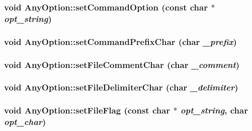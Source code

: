 \label{classAnyOption_a639b708b4c3953e7017f224b9b8082b3}
\hypertarget{classAnyOption_a7df8a4d9c0970f018c91b04bd4c11022}{
\subsubsection[{setCommandOption}]{\setlength{\rightskip}{0pt plus 5cm}void AnyOption::setCommandOption (const char $\ast$ {\em opt\_\-string})}}
\label{classAnyOption_a7df8a4d9c0970f018c91b04bd4c11022}
\hypertarget{classAnyOption_abc3444f2cbbb06f7d6c9a63e49f4992a}{
\subsubsection[{setCommandPrefixChar}]{\setlength{\rightskip}{0pt plus 5cm}void AnyOption::setCommandPrefixChar (char {\em \_\-prefix})}}
\label{classAnyOption_abc3444f2cbbb06f7d6c9a63e49f4992a}
\hypertarget{classAnyOption_a3b164315d146fbc1f8751b0542a8b495}{
\subsubsection[{setFileCommentChar}]{\setlength{\rightskip}{0pt plus 5cm}void AnyOption::setFileCommentChar (char {\em \_\-comment})}}
\label{classAnyOption_a3b164315d146fbc1f8751b0542a8b495}
\hypertarget{classAnyOption_a1076bb812db730236c5309cdb97c8161}{
\subsubsection[{setFileDelimiterChar}]{\setlength{\rightskip}{0pt plus 5cm}void AnyOption::setFileDelimiterChar (char {\em \_\-delimiter})}}
\label{classAnyOption_a1076bb812db730236c5309cdb97c8161}
\hypertarget{classAnyOption_a8fa052e644d8b04b7bd95bda48c16cf8}{
\subsubsection[{setFileFlag}]{\setlength{\rightskip}{0pt plus 5cm}void AnyOption::setFileFlag (const char $\ast$ {\em opt\_\-string}, \/  char {\em opt\_\-char})}}
